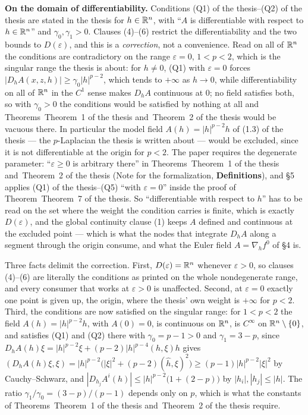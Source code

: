 \begin{definition}
\textbf{On the domain of differentiability.}  Conditions
(Q1) of the thesis--(Q2) of the thesis are stated in the thesis for $h\in\mathbb{R}^n$, with
``$A$ is differentiable with respect to $h\in\mathbb{R}^n$'' and $\gamma_0,\gamma_1>0$.
Clauses (4)--(6) restrict the differentiability and the two bounds to
$D(\varepsilon)$, and this is a \emph{correction}, not a convenience.  Read on
all of $\mathbb{R}^n$ the conditions are contradictory on the range
$\varepsilon=0$, $1<p<2$, which is the singular range the thesis is about: for
$h\ne0$, (Q1) with $\varepsilon=0$ forces
$|D_hA(x,z,h)|\ge\gamma_0|h|^{p-2}$, which tends to $+\infty$ as $h\to0$, while
differentiability on all of $\mathbb{R}^n$ in the $C^1$ sense makes $D_hA$ continuous at
$0$; no field satisfies both, so with $\gamma_0>0$ the conditions would be
satisfied by nothing at all and Theorems~Theorem~1 of the thesis and~Theorem~2 of the thesis would be
vacuous there.  In particular the model field $A(h)=|h|^{p-2}h$ of
(1.3) of the thesis --- the $p$-Laplacian the thesis is written about --- would be
excluded, since it is not differentiable at the origin for $p<2$.  The paper
requires the degenerate parameter: ``$\varepsilon\ge0$ is arbitrary there'' in
Theorems~Theorem~1 of the thesis and~Theorem~2 of the thesis (Note for the formalization,
\textbf{Definitions}), and \S5 applies (Q1) of the thesis--(Q5) ``with
$\varepsilon=0$'' inside the proof of Theorem~Theorem~7 of the thesis.  So
``differentiable with respect to $h$'' has to be read on the set where the
weight the condition carries is finite, which is exactly $D(\varepsilon)$, and
the global continuity clause (1) keeps $A$ defined and continuous at the
excluded point --- which is what the nodes that integrate $D_hA$ along a
segment through the origin consume, and what the Euler field
$A=\nabla_hf^0$ of \S4 is.

Three facts delimit the correction.  First, $D(\varepsilon)=\mathbb{R}^n$ whenever
$\varepsilon>0$, so clauses (4)--(6) are literally the conditions as printed on
the whole nondegenerate range, and every consumer that works at
$\varepsilon>0$ is unaffected.  Second, at $\varepsilon=0$ exactly one point is
given up, the origin, where the thesis' own weight is $+\infty$ for $p<2$.
Third, the conditions are now satisfied on the singular range: for $1<p<2$ the
field $A(h)=|h|^{p-2}h$, with $A(0)=0$, is continuous on $\mathbb{R}^n$, is $C^\infty$
on $\mathbb{R}^n\setminus\{0\}$, and satisfies (Q1) and (Q2) there with
$\gamma_0=p-1>0$ and $\gamma_1=3-p$, since
$D_hA(h)\xi=|h|^{p-2}\xi+(p-2)|h|^{p-4}(h,\xi)h$ gives
$(D_hA(h)\xi,\xi)=|h|^{p-2}\bigl(|\xi|^2+(p-2)(\hat h,\xi)^2\bigr)
\ge(p-1)|h|^{p-2}|\xi|^2$ by Cauchy--Schwarz, and
$|D_{h_j}A^i(h)|\le|h|^{p-2}\bigl(1+(2-p)\bigr)$ by $|h_i|,|h_j|\le|h|$.  The
ratio $\gamma_1/\gamma_0=(3-p)/(p-1)$ depends only on $p$, which is what the
constants of Theorems~Theorem~1 of the thesis and~Theorem~2 of the thesis require.


\end{definition}
